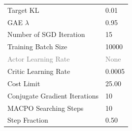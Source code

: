 \documentclass{article}
\begin{document}
\begin{table}[ht]
{\begin{subtable}{.5\textwidth}
\begin{tabular}{ll}
    Target KL & 0.01 \\
    GAE $\lambda$ & 0.95 \\
    Number of SGD Iteration & 15 \\
    Training Batch Size & 10000 \\
    \textcolor{gray}{Actor Learning Rate} & \textcolor{gray}{None} \\
    Critic Learning Rate & 0.0005 \\
    Cost Limit & 25.00 \\
    Conjugate Gradient Iterations & 10 \\
    MACPO Searching Steps & 10 \\
    Step Fraction & 0.50 \\
    \bottomrule
  \end{tabular}
\end{subtable}\hfill 
} 

\end{table}
\end{document}
